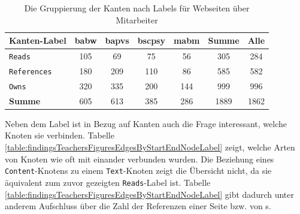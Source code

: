     \begin{table}[htb]
        \centering
        \begin{tabular}{|l|c|c|c|c|c|c|}
            \hline
            \multicolumn{1}{|c|}{\textbf{Kanten-Label}} & \textbf{\gls{babw}} & \textbf{\gls{bapvs}} & \textbf{\gls{bscpsy}} & \textbf{\gls{mabm}} & \textbf{Summe} & \textbf{Alle} \\ \hline
            \texttt{Reads}                                       & 105           & 69             & 75              & 56            & 305            & 284           \\ \hline
            \texttt{References}                                  & 180           & 209            & 110             & 86            & 585            & 582           \\ \hline
            \texttt{Owns}                                        & 320           & 335            & 200             & 144           & 999            & 996           \\ \hline
            \hline
            \textbf{Summe}                              & 605           & 613            & 385             & 286           & 1889           & 1862          \\ \hline
        \end{tabular}
        \caption{Die Gruppierung der Kanten nach Labels für Webseiten über Mitarbeiter}
        \label{table:findingTeachersFiguresEdgesByLabel}
    \end{table}

    Neben dem Label ist in Bezug auf Kanten auch die Frage interessant,
    welche Knoten sie verbinden.
    Tabelle \ref{table:findingsTeachersFiguresEdgesByStartEndNodeLabel}
    zeigt, welche Arten von Knoten wie oft mit einander verbunden wurden.
    Die Beziehung eines \texttt{Content}-Knotens zu einem \texttt{Text}-Knoten
    zeigt die Übersicht nicht,
    da sie äquivalent zum zuvor gezeigten \texttt{Reads}-Label ist.
    Tabelle \ref{table:findingsTeachersFiguresEdgesByStartEndNodeLabel} gibt dadurch unter anderem Aufschluss über die Zahl der Referenzen
    einer Seite bzw. von {\contentFeature}s.

